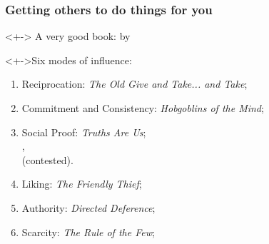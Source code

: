 \begin{frame}
  \frametitle{Getting others to do things for you}

  \begin{block}<+->{}
    A very good book: \cite{cialdini2000a} by 
  \end{block}

  \begin{block}<+->{Six modes of influence:}
    \begin{enumerate}
    \item<+-> 
      \alert{Reciprocation}: \textit{The Old Give and Take... and Take};\\
    \item<+-> 
      \alert{Commitment and Consistency}: \textit{Hobgoblins of the Mind};
    \item<+-> 
      \alert{Social Proof}: \textit{Truths Are Us};\\
       ,\\
       (contested).
    \item<+-> 
      \alert{Liking}: \textit{The Friendly Thief};
    \item<+-> 
      \alert{Authority}: \textit{Directed Deference};\\
    \item<+-> 
      \alert{Scarcity}: \textit{The Rule of the Few};
    \end{enumerate}
  \end{block}

\end{frame}

